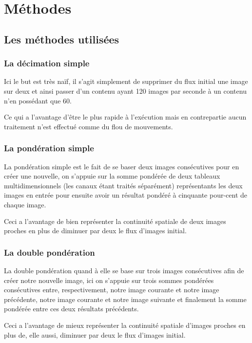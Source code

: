\documentclass[fleqn,10pt]{SelfArx} %
\begin{document}

\section{Méthodes}

\subsection{Les méthodes utilisées}

\subsubsection{La décimation simple}
Ici le but est très naïf, il s'agit simplement de supprimer du flux initial une image sur deux et ainsi passer d'un contenu ayant 120 images par seconde à un contenu n'en possédant que 60.

Ce qui a l'avantage d'être le plus rapide à l'exécution mais en contrepartie aucun traitement n'est effectué comme du flou de mouvements.

\subsubsection{La pondération simple}
La pondération simple est le fait de se baser deux images consécutives pour en créer une nouvelle, on s'appuie sur la somme pondérée de deux tableaux multidimensionnels (les canaux étant traités séparément) représentants les deux images en entrée pour ensuite avoir un résultat pondéré à cinquante pour-cent de chaque image.

Ceci a l'avantage de bien représenter la continuité spatiale de deux images proches en plus de diminuer par deux le flux d'images initial.

\subsubsection{La double pondération}
La double pondération quand à elle se base sur trois images consécutives afin de créer notre nouvelle image, ici on s'appuie sur trois sommes pondérées consécutives entre, respectivement, notre image courante et notre image précédente, notre image courante et notre image suivante et finalement la somme pondérée entre ces deux résultats précédents.

Ceci a l'avantage de mieux représenter la continuité spatiale d'images proches en plus de, elle aussi, diminuer par deux le flux d'images initial.
\end{document}
